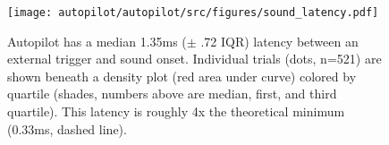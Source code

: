 \begin{figure}[hb!]
\caption{Autopilot has a median 1.35ms ($\pm$ .72 IQR) latency between an external trigger and sound onset. Individual trials (dots, n=521) are shown beneath a density plot (red area under curve) colored by quartile (shades, numbers above are median, first, and third quartile). This latency is roughly 4x the theoretical minimum (0.33ms, dashed line).}
\label{fig:lags}
\texttt{[image: autopilot/autopilot/src/figures/sound\_latency.pdf]}
\end{figure}